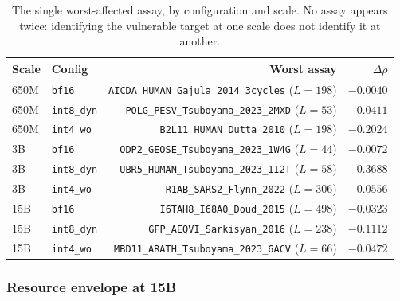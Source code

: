 \documentclass[11pt]{article}
\newcommand{\cfg}[1]{\texttt{#1}}
\begin{document}
\begin{table}[htb]
\centering
\caption{The single worst-affected assay, by configuration and scale. No assay
appears twice: identifying the vulnerable target at one scale does not identify
it at another.}
\label{tab:worst3}
\small
\begin{tabular}{llrr}
\toprule
Scale & Config & Worst assay & $\Delta\rho$ \\
\midrule
650M & \cfg{bf16}      & \texttt{AICDA\_HUMAN\_Gajula\_2014\_3cycles} ($L{=}198$) & $-0.0040$ \\
650M & \cfg{int8\_dyn} & \texttt{POLG\_PESV\_Tsuboyama\_2023\_2MXD} ($L{=}53$)    & $-0.0411$ \\
650M & \cfg{int4\_wo}  & \texttt{B2L11\_HUMAN\_Dutta\_2010} ($L{=}198$)           & $-0.2024$ \\
\addlinespace
3B   & \cfg{bf16}      & \texttt{ODP2\_GEOSE\_Tsuboyama\_2023\_1W4G} ($L{=}44$)   & $-0.0072$ \\
3B   & \cfg{int8\_dyn} & \texttt{UBR5\_HUMAN\_Tsuboyama\_2023\_1I2T} ($L{=}58$)   & $-0.3688$ \\
3B   & \cfg{int4\_wo}  & \texttt{R1AB\_SARS2\_Flynn\_2022} ($L{=}306$)            & $-0.0556$ \\
\addlinespace
15B  & \cfg{bf16}      & \texttt{I6TAH8\_I68A0\_Doud\_2015} ($L{=}498$)           & $-0.0323$ \\
15B  & \cfg{int8\_dyn} & \texttt{GFP\_AEQVI\_Sarkisyan\_2016} ($L{=}238$)         & $-0.1112$ \\
15B  & \cfg{int4\_wo}  & \texttt{MBD11\_ARATH\_Tsuboyama\_2023\_6ACV} ($L{=}66$)  & $-0.0472$ \\
\bottomrule
\end{tabular}
\end{table}

\subsubsection{Resource envelope at 15B}
\end{document}
